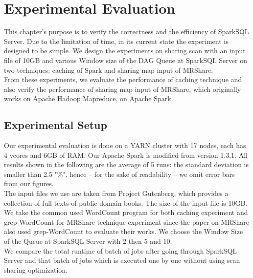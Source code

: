 
\chapter{Experimental Evaluation} %

\label{Chapter5} %


This chapter's purpose is to verify the correctness and the efficiency of SparkSQL Server. Due to the limitation of time, in its current state the experiment is designed to be simple. We design the experiments on sharing scan with an input file of 10GB and various Window size of the DAG Queue at SparkSQL Server on two techniques: caching of Spark and sharing map input of MRShare.\\
From these experiments, we evaluate the performance of caching technique and also verify the performance of sharing map input of MRShare, which originally works on Apache Hadoop Mapreduce, on Apache Spark.


\section{Experimental Setup}
Our experimental evaluation is done on a YARN cluster with 17 nodes, each has 4 vcores and 6GB of RAM. Our Apache Spark is modified from version 1.3.1. All results shown in the following are the average of 5 runs: the standard deviation is smaller than 2.5 "\%", hence – for the sake of readability – we omit error bars from our figures.\\
The input files we use are taken from Project Gutenberg, which provides a collection of full texts of public domain books. The size of the input file is 10GB. We take the common used WordCount program for both caching experiment and grep-WordCount for MRShare technique experiment since the paper on MRShare also used grep-WordCount to evaluate their works. We choose the Window Size of the Queue at SparkSQL Server with 2 then 5 and 10.\\
We compare the total runtime of batch of jobs after going through SparkSQL Server and that batch of jobs which is executed one by one without using scan sharing optimization.

